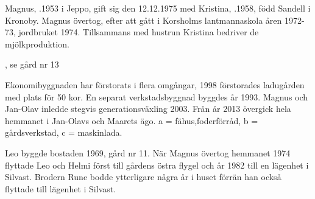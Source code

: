 Magnus, .1953 i Jeppo, gift sig den 12.12.1975 med Kristina, .1958, född Sandell i Kronoby. Magnus övertog, efter att gått i Korsholms lantmannaskola åren 1972-73, jordbruket 1974. Tillsammans med hustrun Kristina bedriver de mjölkproduktion.
\begin{jhchildren}
  \item {}, se gård nr 13
  \item {}
  \item {}
  \item {}
  \item {}
  \item {}
  \item {}
  \item {}
  \item {}
\end{jhchildren}
Ekonomibyggnaden har förstorats i flera omgångar, 1998 förstorades ladugården med plats för 50 kor. En separat verkstadsbyggnad byggdes år 1993. Magnus och Jan-Olav inledde stegvis generationsväxling 2003. Från år 2013 övergick hela hemmanet i Jan-Olavs och Maarets ägo. a = fähus,foderförråd, b = gårdsverkstad, c = maskinlada.


Leo byggde bostaden 1969, gård nr 11. När Magnus övertog hemmanet 1974 flyttade Leo och Helmi först till gårdens östra flygel och år 1982 till en lägenhet i Silvast. Brodern Rune bodde ytterligare några år i huset förrän han också flyttade till lägenhet i Silvast.







